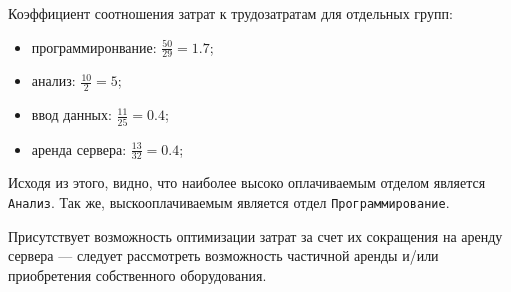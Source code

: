 
Коэффициент соотношения затрат к трудозатратам для отдельных групп:
\begin{itemize}
    \item программиронвание: $\frac{50}{29} = 1.7$;
    \item анализ: $\frac{10}{2} = 5$;
    \item ввод данных: $\frac{11}{25} = 0.4$;
    \item аренда сервера: $\frac{13}{32} = 0.4$;
\end{itemize}

Исходя из этого, видно, что наиболее высоко оплачиваемым отделом является \texttt{Анализ}. Так же, выскооплачиваемым является отдел \texttt{Программирование}.

Присутствует возможность оптимизации затрат за счет их сокращения на аренду сервера --- следует рассмотреть возможность частичной аренды и/или приобретения собственного оборудования.